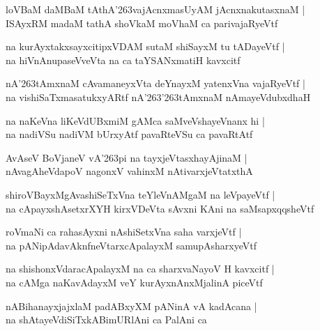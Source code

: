 \documentclass[twoside,12pt,openright]{book}
\def\S{\char'263}
\newcounter{shloka}[chapter]
\begin{document}
\begin{shloka}
loVBaM daMBaM tAthA\S vajAcnxmasUyAM jAcnxnakutasxnaM |\\
ISAyxRM madaM tathA shoVkaM moVhaM  ca parivajaRyeVtf
\end{shloka}

\begin{shloka}
na kurAyxtakxsayxcitipxVDAM sutaM shiSayxM tu tADayeVtf |\\
na hiVnAnupaseVveVta na ca taYSANxmatiH kavxcitf
\end{shloka}

\begin{shloka}
nA\S tAmxnaM cAvamaneyxVta deYnayxM yatenxVna vajaRyeVtf |\\
na vishiSaTxmasatukxyARtf nA\S\S tAmxnaM nAmayeVdubxdhaH 
\end{shloka}

\begin{shloka}
na naKeVna liKeVdUBxmiM gAMca saMveVshayeVnanx hi |\\
na nadiVSu nadiVM bUrxyAtf pavaRteVSu ca pavaRtAtf
\end{shloka}

\begin{shloka}
AvAseV BoVjaneV vA\S pi na tayxjeVtasxhayAjinaM |\\
nAvagAheVdapoV nagonxV vahinxM nAtivarxjeVtatxthA 
\end{shloka}

\begin{shloka}
shiroVBayxMgAvashiSeTxVna teYleVnAMgaM na leVpayeVtf |\\
na cApayxshAsetxrXYH kirxVDeVta sAvxni KAni na saMsapxqqsheVtf 
\end{shloka}

\begin{shloka}
roVmaNi ca rahasAyxni nAshiSetxVna saha varxjeVtf |\\
na pANipAdavAknfneVtarxcApalayxM samupAsharxyeVtf
\end{shloka}

\begin{shloka}
na shishonxVdaracApalayxM na ca sharxvaNayoV H kavxcitf |\\
na cAMga naKavAdayxM veY kurAyxnAnxMjalinA piceVtf 
\end{shloka}

\begin{shloka}
nABihanayxjajxlaM padABxyXM pANinA vA kadAcana |\\
na shAtayeVdiSiTxkABimURlAni ca PalAni ca 
\end{shloka}
\end{document}
